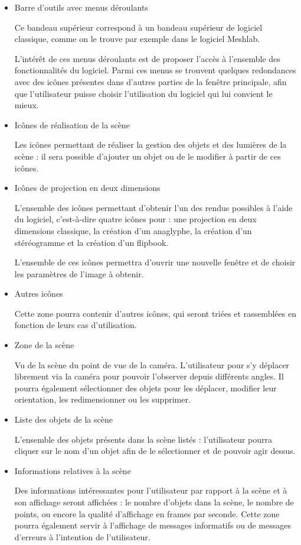 \begin{itemize}
\item Barre d'outils avec menus déroulants
  
  Ce bandeau supérieur correspond à un bandeau supérieur de logiciel classique, comme on le trouve par exemple dans le logiciel Meshlab.

  L’intérêt de ces menus déroulants est de proposer l’accès à l’ensemble des fonctionnalités du logiciel. Parmi ces menus se trouvent quelques redondances avec des icônes présentes dans d’autres parties de la fenêtre principale, afin que l’utilisateur puisse choisir l’utilisation du logiciel qui lui convient le mieux.
  
\item Icônes de réalisation de la scène
  
  Les icônes permettant de réaliser la gestion des objets et des lumières de la scène : il sera possible d’ajouter un objet ou de le modifier à partir de ces icônes.

\item Icônes de projection en deux dimensions
  
  L’ensemble des icônes permettant d’obtenir l’un des rendus possibles à l’aide du logiciel, c’est-à-dire quatre icônes pour : une projection en deux dimensions classique, la création d’un anaglyphe, la création d’un stéréogramme et la création d’un flipbook.
  
  L’ensemble de ces icônes permettra d’ouvrir une nouvelle fenêtre et de choisir les paramètres de l’image à obtenir.

\item Autres icônes
  
  Cette zone pourra contenir d’autres icônes, qui seront triées et rassemblées en fonction de leurs cas d’utilisation.

\item Zone de la scène
  
  Vu de la scène du point de vue de la caméra. L’utilisateur pour s’y déplacer librement via la caméra pour pouvoir l’observer depuis différents angles. Il pourra également sélectionner des objets pour les déplacer, modifier leur orientation, les redimensionner ou les supprimer.

\item Liste des objets de la scène
  
  L’ensemble des objets présents dans la scène listés : l’utilisateur pourra cliquer sur le nom d’un objet afin de le sélectionner et de pouvoir agir dessus.

\item Informations relatives à la scène
  
  Des informations intéressantes pour l’utilisateur par rapport à la scène et à son affichage seront affichées : le nombre d’objets dans la scène, le nombre de points, ou encore la qualité d’affichage en frames par seconde. Cette zone pourra également servir à l’affichage de messages informatifs ou de messages d’erreurs à l’intention de l’utilisateur.
\end{itemize}

